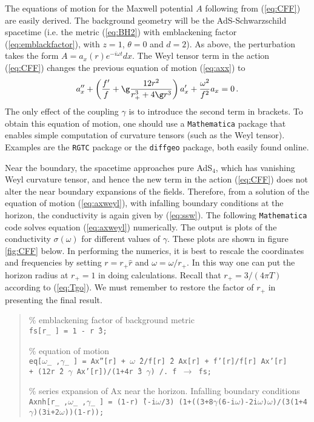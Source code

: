 \documentclass[10pt, oneside]{book}
\def\be{\begin{equation}}
\def\ee{\end{equation}}
\begin{document}
\begin{doublespace}
The equations of motion for the Maxwell potential $A$ following from (\ref{eq:CFF}) are easily derived. The background geometry will be the AdS-Schwarzschild spacetime (i.e. the metric (\ref{eq:BH2}) with emblackening factor (\ref{eq:emblackfactor}), with $z=1$, $\theta= 0$ and $d=2$). As above, the perturbation takes the form $A = a_x(r) e^{- i \omega t} dx$. The Weyl tensor term in the action (\ref{eq:CFF}) changes the previous equation of motion (\ref{eq:axx}) to \cite{WitczakKrempa:2012gn}
\be\label{eq:axweyl}
a_x'' + \left(\frac{f'}{f} + \g \frac{12 r^2}{r_+^3 + 4 \g r^3} \right) a_x' + \frac{\omega^2}{f^2} a_x = 0 \,.
\ee
The only effect of the coupling $\gamma$ is to introduce the second term in brackets. To obtain this equation of motion, one should use a \texttt{Mathematica} package that enables simple computation of curvature tensors (such as the Weyl tensor). Examples are the \texttt{RGTC} package or the \texttt{diffgeo} package, both easily found online.

Near the boundary, the spacetime approaches pure AdS$_4$, which has vanishing Weyl curvature tensor, and hence the new term in the action (\ref{eq:CFF}) does not alter the near boundary expansions of the fields. Therefore, from a solution of the equation of motion (\ref{eq:axweyl}), with infalling boundary conditions at the horizon, the conductivity is again given by (\ref{eq:ssw}). The following \texttt{Mathematica} code solves equation (\ref{eq:axweyl}) numerically. The output is plots of the conductivity $\sigma(\omega)$ for different values of $\gamma$. These plots are shown in figure \ref{fig:CFF} below. In performing the numerics, it is best to rescale the coordinates and frequencies by setting $r = r_+ \hat r$ and $\omega = \hat \omega/r_+$. In this way one can put the horizon radius at $r_+ = 1$ in doing calculations. Recall that $r_+ = 3/(4 \pi T)$ according to (\ref{eq:Tgo}). We must remember to restore the factor of $r_+$ in presenting the final result.

\begin{quote} 
\% emblackening factor of background metric \\
\texttt{fs[r\_\,] = 1 - r\^\,3;}

\% equation of motion \\
\texttt{eq[$\omega$\_\,,$\gamma$\_\,] = 
 Ax''[r] + $\omega$\^\,2/f[r]\^\,2 Ax[r] + f'[r]/f[r] Ax'[r] \\ + (12r\^\,2 $\gamma$ Ax'[r])/(1+4r\^\,3 $\gamma$) /.\,f $\to$ fs;}
 
\%  series expansion of Ax near the horizon. Infalling boundary conditions \\
\texttt{Axnh[r\_\,,$\omega$\_\,,$\gamma$\_\,] = (1-r)\^\,(-i$\omega$/3) (1+((3+8$\gamma$(6-i$\omega$)-2i$\omega$)$\omega$)/(3(1+4$\gamma$)(3i+2$\omega$))(1-r));}


\end{quote}
\end{doublespace}
\end{document}
